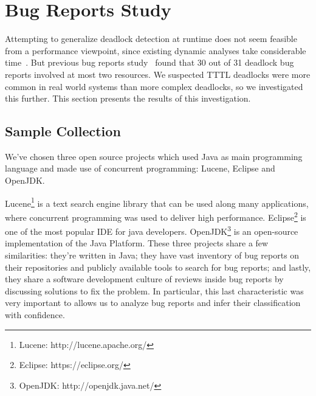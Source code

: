 \section{Bug Reports Study}\label{bugs}

Attempting to generalize deadlock detection at runtime does not seem feasible from a performance viewpoint, since existing dynamic analyses take considerable time~\cite{magicfuzzer}. But previous bug reports study~\cite{lu} found that 30 out of 31 deadlock bug reports involved at most two resources. We suspected TTTL deadlocks were more common in real world systems than more complex deadlocks, so we investigated this further. This section presents the results of this investigation.

\subsection{Sample Collection}

We've chosen three open source projects which used Java as main programming language and made use of concurrent programming: Lucene, Eclipse and OpenJDK.

Lucene\footnote{Lucene: http://lucene.apache.org/} is a text search engine library that can be used along many applications, where concurrent programming was used to deliver high performance. Eclipse\footnote{Eclipse: https://eclipse.org/} is one of the most popular IDE for java developers. OpenJDK\footnote{OpenJDK: http://openjdk.java.net/} is an open-source implementation of the Java Platform. These three projects share a few similarities: they're written in Java; they have vast inventory of bug reports on their repositories and publicly available tools to search for bug reports; and lastly, they share a software development culture of reviews inside bug reports by discussing solutions to fix the problem. In particular, this last characteristic was very important to allows us to analyze bug reports and infer their classification with confidence.

